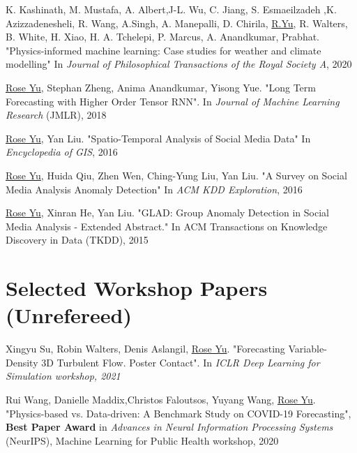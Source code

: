 \documentclass[margin,line]{res}
\begin{document}
\begin{resume}
\begin{enumerate}[label={[J\arabic*]}]
\item K. Kashinath, M. Mustafa, A. Albert,J-L. Wu, C. Jiang, S. Esmaeilzadeh ,K. Azizzadenesheli, R. Wang, A.Singh, A. Manepalli, D. Chirila, \underline{R.Yu}, R. Walters, B. White, H. Xiao, H. A. Tchelepi, P. Marcus, A. Anandkumar,  Prabhat. "Physics-informed machine learning: Case studies for weather and climate modelling" In \textit{Journal of Philosophical Transactions of the Royal Society  A}, 2020

\item \underline{Rose Yu}, Stephan Zheng, Anima Anandkumar, Yisong Yue. "Long Term Forecasting with Higher Order Tensor RNN". In  \textit{ Journal of Machine Learning Research} (JMLR), 2018



\item \underline{Rose Yu},  Yan Liu.  "Spatio-Temporal Analysis of Social Media Data"  In \textit{Encyclopedia of GIS}, 2016

\item \underline{Rose Yu}, Huida Qiu, Zhen Wen, Ching-Yung Liu,  Yan Liu. "A Survey on Social Media Analysis  Anomaly Detection" In \textit{ACM KDD Exploration},  2016

\item \underline{Rose Yu}, Xinran He, Yan Liu. "GLAD: Group Anomaly Detection in Social Media Analysis - Extended Abstract." In \textit{}ACM Transactions on Knowledge Discovery in Data  (TKDD), 2015
\end{enumerate}


 
\section{\sc Selected
Workshop
Papers
(Unrefereed) }
\begin{enumerate}[label={[W\arabic*]}]
\item Xingyu Su,  Robin Walters,  Denis Aslangil, \underline{Rose Yu}.
"Forecasting Variable-Density 3D Turbulent Flow. Poster Contact".  In \textit{ICLR Deep Learning for Simulation workshop, 2021}

\item Rui Wang, Danielle Maddix,Christos Faloutsos, Yuyang Wang, \underline{Rose Yu}. "Physics-based vs. Data-driven: A Benchmark Study on COVID-19 Forecasting",  \textbf{Best Paper Award}  in \textit{Advances in Neural Information Processing Systems} (NeurIPS), Machine Learning for Public Health workshop, 2020




\end{enumerate}
\end{resume}
\end{document}
